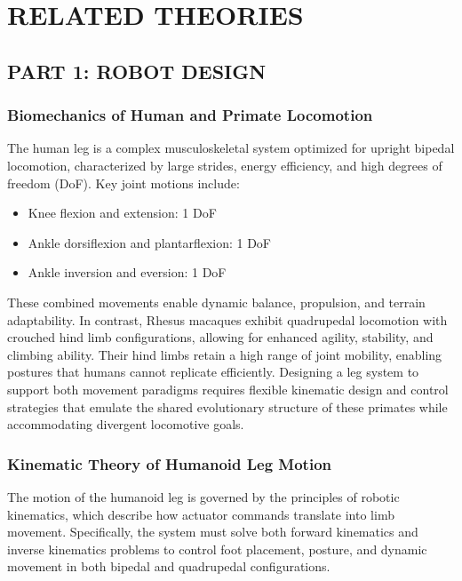 \chapter{RELATED THEORIES}

\section{PART 1: ROBOT DESIGN}

\subsection{Biomechanics of Human and Primate Locomotion}

The human leg is a complex musculoskeletal system optimized for upright bipedal locomotion, characterized by large strides, energy efficiency, and high degrees of freedom (DoF). Key joint motions include:
\begin{itemize}
    \item Knee flexion and extension: 1 DoF
    \item Ankle dorsiflexion and plantarflexion: 1 DoF
    \item Ankle inversion and eversion: 1 DoF
\end{itemize}

These combined movements enable dynamic balance, propulsion, and terrain adaptability. In contrast, Rhesus macaques exhibit quadrupedal locomotion with crouched hind limb configurations, allowing for enhanced agility, stability, and climbing ability. Their hind limbs retain a high range of joint mobility, enabling postures that humans cannot replicate efficiently. Designing a leg system to support both movement paradigms requires flexible kinematic design and control strategies that emulate the shared evolutionary structure of these primates while accommodating divergent locomotive goals.

\subsection{Kinematic Theory of Humanoid Leg Motion}

The motion of the humanoid leg is governed by the principles of robotic kinematics, which describe how actuator commands translate into limb movement. Specifically, the system must solve both forward kinematics and inverse kinematics problems to control foot placement, posture, and dynamic movement in both bipedal and quadrupedal configurations.

